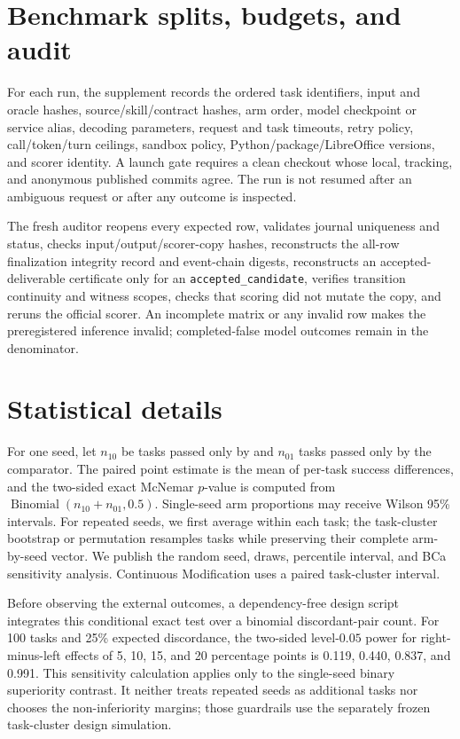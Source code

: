 \section{Benchmark splits, budgets, and audit}
\label{app:protocol}

For each run, the supplement records the ordered task identifiers, input and
oracle hashes, source/skill/contract hashes, arm order, model checkpoint or
service alias, decoding parameters, request and task timeouts, retry policy,
call/token/turn ceilings, sandbox policy, Python/package/LibreOffice versions,
and scorer identity. A launch gate requires a clean checkout whose local,
tracking, and anonymous published commits agree. The run is not resumed after
an ambiguous request or after any outcome is inspected.

The fresh auditor reopens every expected row, validates journal uniqueness and
status, checks input/output/scorer-copy hashes, reconstructs the all-row
finalization integrity record and event-chain digests, reconstructs an accepted-
deliverable certificate only for an \texttt{accepted\_candidate}, verifies
transition continuity and witness scopes, checks that scoring did not mutate
the copy, and reruns the official scorer. An incomplete matrix or any invalid
row makes the preregistered inference invalid; completed-false model outcomes
remain in the denominator.

\section{Statistical details}
\label{app:statistics}

For one seed, let $n_{10}$ be tasks passed only by \method{} and $n_{01}$ tasks
passed only by the comparator. The paired point estimate is the mean of per-task
success differences, and the two-sided exact McNemar $p$-value is computed from
$\operatorname{Binomial}(n_{10}+n_{01},0.5)$. Single-seed arm proportions may
receive Wilson 95\% intervals. For repeated seeds, we first average within each
task; the task-cluster bootstrap or permutation resamples tasks while preserving
their complete arm-by-seed vector. We publish the random seed, draws, percentile
interval, and BCa sensitivity analysis. Continuous Modification uses a paired
task-cluster interval.

Before observing the external outcomes, a dependency-free design script
integrates this conditional exact test over a binomial discordant-pair count.
For 100 tasks and 25\% expected discordance, the two-sided level-$0.05$ power
for right-minus-left effects of 5, 10, 15, and 20 percentage points is 0.119,
0.440, 0.837, and 0.991. This sensitivity calculation applies only to the
single-seed binary superiority contrast. It neither treats repeated seeds as
additional tasks nor chooses the non-inferiority margins; those guardrails use
the separately frozen task-cluster design simulation.

